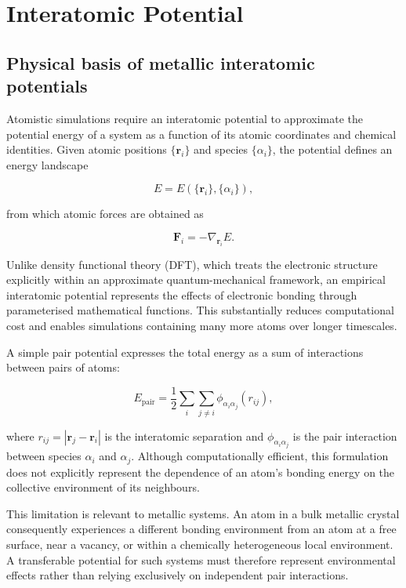 \section{Interatomic Potential}

\subsection{Physical basis of metallic interatomic potentials}

Atomistic simulations require an interatomic potential to approximate the 
potential energy of a system as a function of its atomic coordinates and 
chemical identities. Given atomic positions $\{\mathbf{r}_i\}$ and species 
$\{\alpha_i\}$, the potential defines an energy landscape

\begin{equation}
    E = E(\{\mathbf{r}_i\},\{\alpha_i\}),
\end{equation}

from which atomic forces are obtained as

\begin{equation}
    \mathbf{F}_i = -\nabla_{\mathbf{r}_i} E.
\end{equation}

Unlike density functional theory (DFT), which treats 
the electronic structure explicitly within an approximate quantum-mechanical 
framework, an empirical interatomic potential represents the effects of 
electronic bonding through parameterised mathematical functions. This 
substantially reduces computational cost and enables simulations containing 
many more atoms over longer timescales.

A simple pair potential expresses the total energy as a sum of interactions 
between pairs of atoms:

\begin{equation}
    E_{\mathrm{pair}}
    = \frac{1}{2}\sum_i\sum_{j\ne i}
    \phi_{\alpha_i\alpha_j}(r_{ij}),
    \label{eq:pair-potential}
\end{equation}

where $r_{ij}=|\mathbf{r}_j-\mathbf{r}_i|$ is the interatomic separation and 
$\phi_{\alpha_i\alpha_j}$ is the pair interaction between species $\alpha_i$ 
and $\alpha_j$. Although computationally efficient, this formulation does not explicitly 
represent the dependence of an atom's bonding energy on the collective 
environment of its neighbours.

This limitation is relevant to metallic systems. An atom in a bulk metallic crystal
consequently experiences a different bonding environment from an atom at a free 
surface, near a vacancy, or within a chemically heterogeneous local 
environment. A transferable potential for such systems must therefore 
represent environmental effects rather than relying exclusively on independent 
pair interactions.

